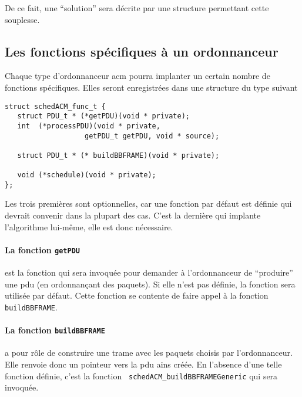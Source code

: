    De ce fait, une ``solution'' sera décrite par une structure
permettant cette souplesse.

%
\subsection{Les fonctions spécifiques à un ordonnanceur}

   Chaque type d'ordonnanceur {\sc acm} pourra implanter un certain
nombre de fonctions spécifiques. Elles seront enregistrées dans une
structure du type suivant 

\begin{verbatim}
struct schedACM_func_t {
   struct PDU_t * (*getPDU)(void * private);
   int  (*processPDU)(void * private,
	               getPDU_t getPDU, void * source);

   struct PDU_t * (* buildBBFRAME)(void * private);

   void (*schedule)(void * private);
};
\end{verbatim}

   Les trois premières sont optionnelles, car une fonction par défaut
est définie qui devrait convenir dans la plupart des cas. C'est la
dernière qui implante l'algorithme lui-même, elle est donc nécessaire.

\paragraph{La fonction {\tt getPDU}}  est la fonction qui sera invoquée pour
demander à l'ordonnanceur de ``produire'' une {\sc pdu} (en
ordonnançant des paquets). Si elle n'est pas définie, la fonction
 sera
utilisée par défaut. Cette fonction se contente de faire appel à la
fonction {\tt buildBBFRAME}.

\paragraph{La fonction {\tt buildBBFRAME}} a pour rôle de construire
une trame avec les paquets choisis par l'ordonnanceur. Elle renvoie
donc un pointeur vers la {\sc pdu} ains créée. En l'absence d'une
telle fonction définie, c'est la fonction
 {\tt
  schedACM\_buildBBFRAMEGeneric} qui sera invoquée.

